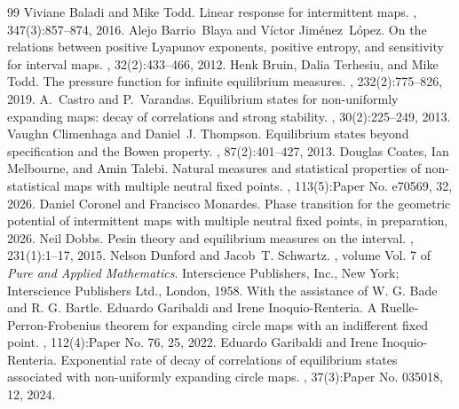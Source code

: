 \documentclass[10pt,a4paper]{amsart}
\numberwithin{equation}{section} %
\numberwithin{figure}{section} %
\renewcommand{\=}{\coloneqq}
\begin{document}
\begin{thebibliography}{99}
 Viviane Baladi and Mike Todd. \newblock Linear response for intermittent maps. , 347(3):857--874, 2016.
 Alejo Barrio~Blaya and V\'ictor Jim\'enez~L\'opez. \newblock On the relations between positive {L}yapunov exponents, positive entropy, and sensitivity for interval maps. , 32(2):433--466, 2012.
 Henk Bruin, Dalia Terhesiu, and Mike Todd. \newblock The pressure function for infinite equilibrium measures. , 232(2):775--826, 2019.
 A.~Castro and P.~Varandas. \newblock Equilibrium states for non-uniformly expanding maps: decay of correlations and strong stability. , 30(2):225--249, 2013.
 Vaughn Climenhaga and Daniel~J. Thompson. \newblock Equilibrium states beyond specification and the {B}owen property. , 87(2):401--427, 2013.
 Douglas Coates, Ian Melbourne, and Amin Talebi. \newblock Natural measures and statistical properties of non-statistical maps with multiple neutral fixed points. , 113(5):Paper No. e70569, 32, 2026.
 Daniel Coronel and Francisco Monardes. \newblock Phase transition for the geometric potential of intermittent maps with multiple neutral fixed points, in preparation, 2026.
 Neil Dobbs. \newblock Pesin theory and equilibrium measures on the interval. , 231(1):1--17, 2015.
 Nelson Dunford and Jacob~T. Schwartz. , volume Vol. 7 of {\em Pure and Applied Mathematics}. \newblock Interscience Publishers, Inc., New York; Interscience Publishers Ltd., London, 1958. \newblock With the assistance of W. G. Bade and R. G. Bartle.
 Eduardo Garibaldi and Irene Inoquio-Renteria. \newblock A {R}uelle-{P}erron-{F}robenius theorem for expanding circle maps with an indifferent fixed point. , 112(4):Paper No. 76, 25, 2022.
 Eduardo Garibaldi and Irene Inoquio-Renteria. \newblock Exponential rate of decay of correlations of equilibrium states associated with non-uniformly expanding circle maps. , 37(3):Paper No. 035018, 12, 2024.

\end{thebibliography}
\end{document}
